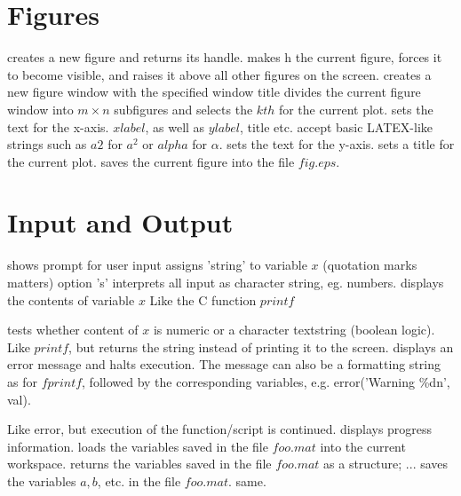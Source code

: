 \section{Figures}{}
	{creates a new figure and returns its handle.}
	{makes h the current figure, forces it to become visible, and raises it above all other figures on the screen.}
	{creates a new figure window with the specified window title}
	{divides the current figure window into $m \times n$ subfigures and selects the $kth$ for the current plot.}
	{sets the text for the x-axis. $xlabel$, as well as
$ylabel$, title etc. accept basic LATEX-like strings such as $a$\expon $2$ for
$a^2$ or \bs $alpha$ for $\alpha$.}
	{sets the text for the y-axis.}
	{sets a title for the current plot.}
	{saves the current figure into the file $fig.eps$.}

\section{Input and Output}{}
	{shows prompt for user input}
	{assigns 'string' to variable $x$ (quotation marks matters)}
	{option 's' interprets all input as character string, eg. numbers.}
	{displays the contents of variable $x$}
	{Like the C function $printf$}

	{tests whether content of $x$ is numeric or a character textstring (boolean logic).}
	{Like $printf$, but returns the string instead of printing it to the screen.}
	{displays an error message and halts execution. The message
can also be a formatting string as for $fprintf$, followed by the corresponding
variables, e.g. error('Warning \bs \%d\bs n', val).}

	{Like error, but execution of the function/script is continued. }
	{displays progress information.}
	{loads the variables saved in the file $foo.mat$ into the current workspace.}
	{returns the variables saved in the file $foo.mat$ as a structure;}
	{... saves the variables $a, b$, etc. in the file $foo.mat$.}
	{same.}

